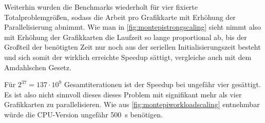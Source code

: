 Weiterhin wurden die Benchmarks wiederholt für vier fixierte Totalproblemgrößen, sodass die Arbeit pro Grafikkarte mit Erhöhung der Parallelisierung abnimmt.
Wie man in \autoref{fig:montepistrongscaling} sieht nimmt also mit Erhöhung der Grafikkarten die Laufzeit so lange proportional ab, bis der Großteil der benötigten Zeit nur noch aus der seriellen Initialisierungszeit besteht und sich somit der wirklich erreichte Speedup sättigt, vergleiche auch mit dem Amdahlschen Gesetz.

Für $2^37=137\cdot 10^9$ Gesamtiterationen ist der Speedup bei ungefähr vier gesättigt.
Es ist also nicht sinnvoll dieses dieses Problem mit signifikant mehr als vier Grafikkarten zu parallelisieren.
Wie aus \autoref{fig:montepiworkloadscaling} entnehmbar würde die CPU-Version ungefähr \SI{500}{\second} benötigen.

